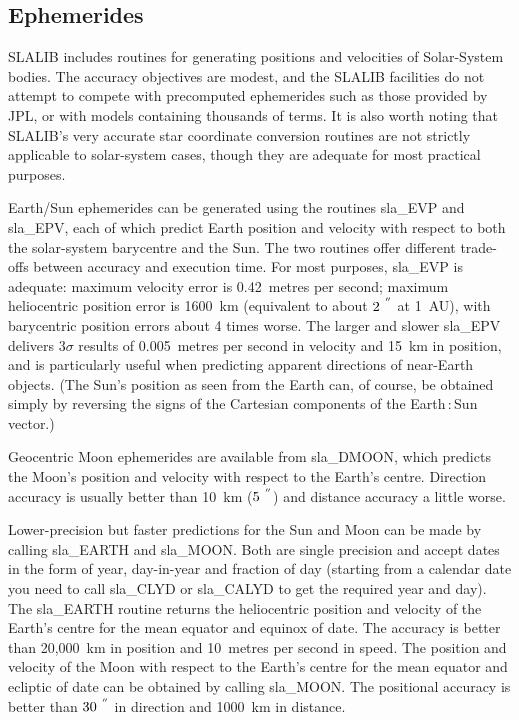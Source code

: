 \documentclass[11pt,twoside,nolof]{starlink}
\providecommand{\arcseci}[1] {$#1\hspace{-0.05em}$\raisebox{-0.5ex}
                         {$^{'\hspace{-0.1em}'}$}}
\begin{document}
\label{ephem}
\subsection{Ephemerides}
SLALIB includes routines for generating positions and
velocities of Solar-System bodies.  The accuracy objectives are
modest, and the SLALIB facilities do not attempt
to compete with precomputed ephemerides such as
those provided by JPL, or with models containing
thousands of terms.  It is also worth noting
that SLALIB's very accurate star coordinate conversion
routines are not strictly applicable to solar-system cases,
though they are adequate for most practical purposes.

Earth/Sun ephemerides can be generated using the routines
sla\_EVP and
sla\_EPV,
each of which predict Earth position and velocity with respect to both the
solar-system barycentre and the
Sun.  The two routines offer different trade-offs between
accuracy and execution time.  For most purposes,
sla\_EVP is adequate:
maximum velocity error is 0.42~metres per second;  maximum
heliocentric position error is 1600~km (equivalent to
about \arcseci{2} at 1~AU), with
barycentric position errors about 4 times worse.
The larger and slower
sla\_EPV
delivers $3\sigma$ results of 0.005~metres per second in velocity
and 15~km in position, and is particularly useful when predicting
apparent directions of near-Earth objects.
(The Sun's position as
seen from the Earth can, of course, be obtained simply by
reversing the signs of the Cartesian components of the
Earth\,:\,Sun vector.)

Geocentric Moon ephemerides are available from
sla\_DMOON,
which predicts the Moon's position and velocity with respect to
the Earth's centre.  Direction accuracy is usually better than
10~km (\arcseci{5}) and distance accuracy a little worse.

Lower-precision but faster predictions for the Sun and Moon
can be made by calling
sla\_EARTH
and
sla\_MOON.
Both are single precision and accept dates in the form of
year, day-in-year and fraction of day
(starting from a calendar date you need to call
sla\_CLYD
or
sla\_CALYD
to get the required year and day).
The
sla\_EARTH
routine returns the heliocentric position and velocity
of the Earth's centre for the mean equator and
equinox of date.  The accuracy is better than 20,000~km in position
and 10~metres per second in speed.
The
position and velocity of the Moon with respect to the
Earth's centre for the mean equator and ecliptic of date
can be obtained by calling
sla\_MOON.
The positional accuracy is better than \arcseci{30} in direction
and 1000~km in distance.
\end{document}
